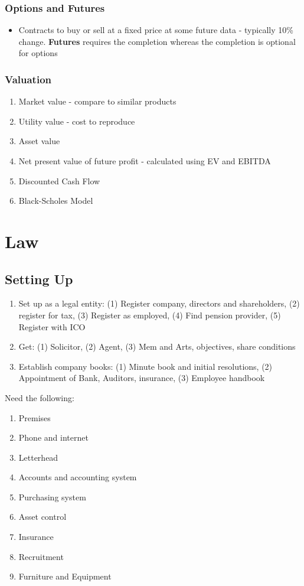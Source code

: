 \documentclass{article}
\begin{document}
\begin{multicols}{2}
\subsubsection{Options and Futures}
\begin{itemize}
    \item Contracts to buy or sell at a fixed price at some future data - typically 10\% change. \textbf{Futures} requires the completion whereas the completion is optional for options
\end{itemize}

\subsubsection{Valuation}
\begin{enumerate}
    \item Market value - compare to similar products
    \item Utility value - cost to reproduce
    \item Asset value
    \item Net present value of future profit - calculated using EV and EBITDA
    \item Discounted Cash Flow
    \item Black-Scholes Model
\end{enumerate}

\section{Law}
\subsection{Setting Up}
\begin{enumerate}
    \item Set up as a legal entity: (1) Register company, directors and shareholders, (2) register for tax, (3) Register as employed, (4) Find pension provider, (5) Register with ICO
    \item Get: (1) Solicitor, (2) Agent, (3) Mem and Arts, objectives, share conditions
    \item Establish company books: (1) Minute book and initial resolutions, (2) Appointment of Bank, Auditors, insurance, (3) Employee handbook
\end{enumerate}

Need the following:
\begin{enumerate}
    \item Premises
    \item Phone and internet
    \item Letterhead
    \item Accounts and accounting system
    \item Purchasing system
    \item Asset control
    \item Insurance
    \item Recruitment
    \item Furniture and Equipment
\end{enumerate}


\end{multicols}
\end{document}
